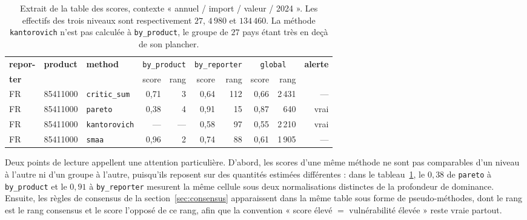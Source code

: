 \documentclass[11pt,a4paper]{article}
\theoremstyle{definition}
\theoremstyle{remark}
\begin{document}
\begin{table}[htbp]
  \centering
  \small
  \renewcommand{\arraystretch}{1.2}
  \begin{tabular}{@{}l l l r r r r r r r@{}}
    \toprule
    \textbf{repor-} & \textbf{product} & \textbf{method}
      & \multicolumn{2}{c}{\texttt{by\_product}}
      & \multicolumn{2}{c}{\texttt{by\_reporter}}
      & \multicolumn{2}{c}{\texttt{global}} & \textbf{alerte} \\
    \cmidrule(lr){4-5}\cmidrule(lr){6-7}\cmidrule(lr){8-9}
    \textbf{ter} & & & score & rang & score & rang & score & rang & \\
    \midrule
    FR & 85411000 & \texttt{critic\_sum}  & 0,71 & 3 & 0,64 & 112 & 0,66 & 2\,431 & --- \\
    FR & 85411000 & \texttt{pareto}       & 0,38 & 4 & 0,91 & 15  & 0,87 & 640    & vrai \\
    FR & 85411000 & \texttt{kantorovich}  & ---  & ---& 0,58 & 97  & 0,55 & 2\,210 & vrai \\
    FR & 85411000 & \texttt{smaa}         & 0,96 & 2 & 0,74 & 88  & 0,61 & 1\,905 & --- \\
    \bottomrule
  \end{tabular}
  \caption{Extrait de la table des scores, contexte « annuel / import / valeur / 2024 ».
  Les effectifs des trois niveaux sont respectivement $27$, $4\,980$ et $134\,460$. La
  méthode \texttt{kantorovich} n'est pas calculée à \texttt{by\_product}, le groupe de
  $27$ pays étant très en deçà de son plancher.}
  \label{tab:app-scores}
\end{table}

\bigskip

Deux points de lecture appellent une attention particulière. D'abord, les scores d'une même
méthode ne sont pas comparables d'un niveau à l'autre ni d'un groupe à l'autre, puisqu'ils
reposent sur des quantités estimées différentes : dans le tableau~\ref{tab:app-scores}, le
$0{,}38$ de \texttt{pareto} à \texttt{by\_product} et le $0{,}91$ à \texttt{by\_reporter}
mesurent la même cellule sous deux normalisations distinctes de la profondeur de dominance.
Ensuite, les règles de consensus de la section~\ref{sec:consensus} apparaissent dans la même
table sous forme de pseudo-méthodes, dont le rang est le rang consensus et le score
l'opposé de ce rang, afin que la convention « score élevé $=$ vulnérabilité élevée » reste
vraie partout.

\medskip
\end{document}
